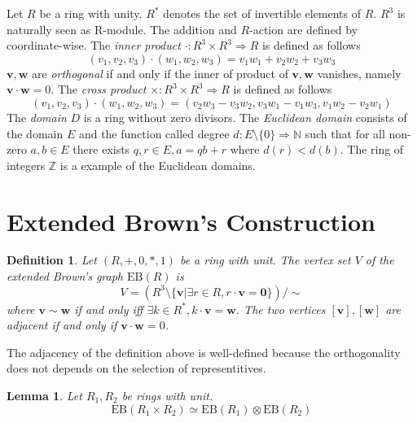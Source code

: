 \documentclass{article}
\newtheorem{Def}{Definition}
\newtheorem{Lem}{Lemma}
\newcommand{\Z}{\mathbb Z}
\newcommand{\N}{\mathbb N}
\newcommand{\EB}{\mathrm{EB}}
\begin{document}
\iffalse

The {\it tensor product} of two graphs $G_1=(V_1,E_1),G_2=(V_2,E_2)$ is a graph $G_1 \otimes G_2$ such that the vertex set is a cartesian product of $V_1$ and $V_2$ and two vertices $(v_1,v_2) \sim (w_1,w_2)$ if and only if $v_1 \sim v_2$ and $w_1 \sim w_2$. If $G_1, G_2$ are regular, the tensor product $G_1 \times G_2$ is also regular. 

\fi

Let $R$ be a ring with unity. 
$R^*$ denotes the set of invertible elements of $R$.
$R^3$ is naturally seen as R-module. 
The addition and $R$-action are defined by coordinate-wise.
The {\it inner product} $\cdot: R^3 \times R^3 \Rightarrow R$ is defined as follows
\[ (v_1,v_2,v_3) \cdot (w_1,w_2,w_3) = v_1 w_1 + v_2 w_2 + v_3 w_3 \]
${\bm v}, {\bm w}$ are {\it orthogonal} if and only if the inner of product of ${\bm v}, {\bm w}$  vanishes, namely ${\bm v} \cdot {\bm w} = 0$.
The {\it cross product} $\times: R^3 \times R^3 \Rightarrow R$ is defined as follows
\[ (v_1,v_2,v_3) \cdot (w_1,w_2,w_3) = ( v_2 w_3 - v_3 w_2, v_3 w_1 - v_1 w_3, v_1 w_2 - v_2 w_1 ) \]
The {\it domain} $D$ is a ring without zero divisors.
The {\it Euclidean domain} consists of the domain $E$ and the function called degree $d: E \setminus \{0\} \Rightarrow \N$ such that for all non-zero $a,b \in E$ there exists $q,r \in E, a = q b + r$ where $d(r) < d(b)$.
The ring of integers $\Z$ is a example of the Euclidean domains.


\section{Extended Brown's Construction}
\begin{Def}
Let $(R,+,0,*,1)$ be a ring with unit. The vertex set $V$ of the extended Brown's graph $\EB(R)$ is \[ V = ( R^3 \setminus \{\bm v | \exists r \in R, r \cdot {\bm v} = {\bm 0} \} ) / \sim\]
where $\bm v \sim \bm w$ if and only iff $\exists k \in R^*, k \cdot {\bm v} = {\bm w}$. The two vertices $[\bm v],[\bm w]$ are adjacent if and only if ${\bm v} \cdot {\bm w} = 0$.
\end{Def}

The adjacency of the definition above is well-defined because the orthogonality does not depends on the selection of representitives.

\iffalse

\begin{Lem}
Let $R_1, R_2$ be rings with unit. 
\[ \EB(R_1 \times R_2) \simeq \EB(R_1) \otimes \EB(R_2) \]
\end{Lem}
\end{document}
